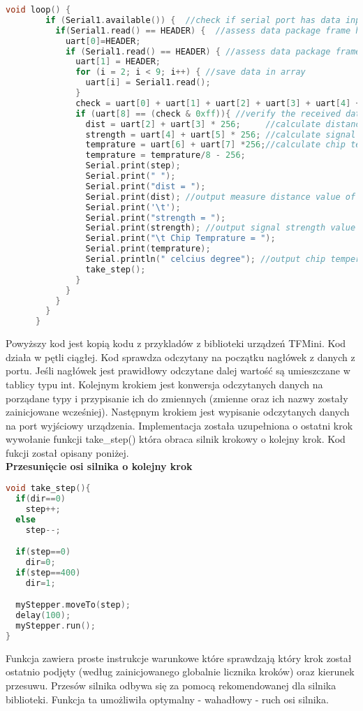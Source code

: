 \begin{lstlisting}[language=C++, caption=Odczyt danych z dalmierza]
    void loop() { 
        if (Serial1.available()) {  //check if serial port has data input
          if(Serial1.read() == HEADER) {  //assess data package frame header 0x59
            uart[0]=HEADER;
            if (Serial1.read() == HEADER) { //assess data package frame header 0x59
              uart[1] = HEADER;
              for (i = 2; i < 9; i++) { //save data in array
                uart[i] = Serial1.read();
              }
              check = uart[0] + uart[1] + uart[2] + uart[3] + uart[4] + uart[5] + uart[6] + uart[7];
              if (uart[8] == (check & 0xff)){ //verify the received data as per protocol
                dist = uart[2] + uart[3] * 256;     //calculate distance value
                strength = uart[4] + uart[5] * 256; //calculate signal strength value
                temprature = uart[6] + uart[7] *256;//calculate chip temprature
                temprature = temprature/8 - 256;
                Serial.print(step);
                Serial.print(" ");
                Serial.print("dist = ");
                Serial.print(dist); //output measure distance value of LiDAR
                Serial.print('\t');
                Serial.print("strength = ");
                Serial.print(strength); //output signal strength value
                Serial.print("\t Chip Temprature = ");
                Serial.print(temprature);
                Serial.println(" celcius degree"); //output chip temperature of Lidar
                take_step();         
              }
            }
          }
        }
      }
\end{lstlisting}
Powyższy kod jest kopią kodu z przykladów z biblioteki urządzeń TFMini. Kod działa w pętli ciągłej. Kod sprawdza odczytany na początku nagłówek z danych z portu. Jeśli nagłówek jest prawidłowy odczytane dalej wartość są umieszczane w tablicy typu int. Kolejnym krokiem jest konwersja odczytanych danych na porządane typy i przypisanie ich do zmiennych (zmienne oraz ich nazwy zostały zainicjowane wcześniej). Następnym krokiem jest wypisanie odczytanych danych na port wyjściowy urządzenia. Implementacja została uzupełniona o ostatni krok wywołanie funkcji take\_step() która obraca silnik krokowy o kolejny krok. Kod fukcji został opisany poniżej.\\

\textbf{Przesunięcie osi silnika o kolejny krok}

\begin{lstlisting}[language=C++, caption=Przesunięcie o kolejny krok]
void take_step(){
  if(dir==0)
    step++;
  else
    step--;

  if(step==0)
    dir=0;
  if(step==400)
    dir=1;

  myStepper.moveTo(step);
  delay(100);
  myStepper.run();
}
\end{lstlisting}
Funkcja zawiera proste instrukcje warunkowe które sprawdzają który krok został ostatnio podjęty (według zainicjowanego globalnie licznika kroków) oraz kierunek przesuwu. Przesów silnika odbywa się za pomocą rekomendowanej dla silnika biblioteki. Funkcja ta umożliwiła optymalny - wahadłowy - ruch osi silnika.\\


